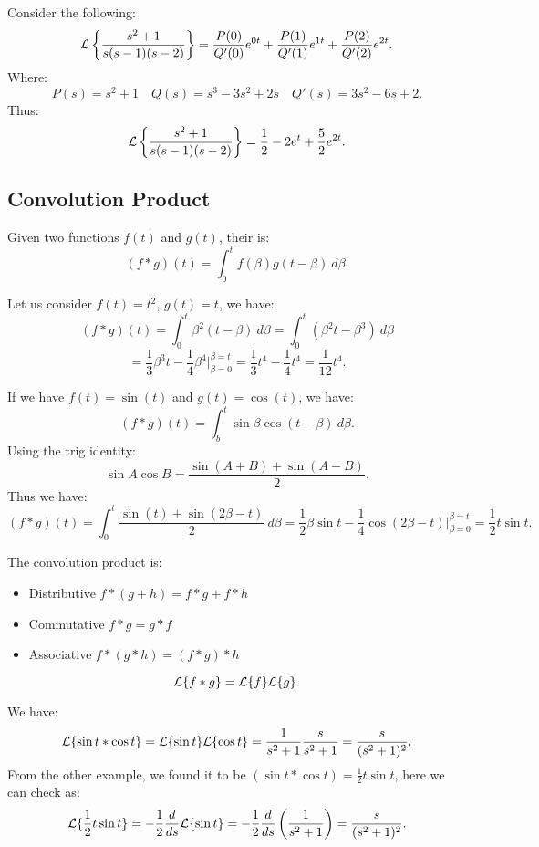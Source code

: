 \documentclass[../main/main.tex]{subfiles}
\begin{document}
\begin{example}
	Consider the following: \[
		\mathcal{L} \left\{ \frac{s^2+1}{s(s-1)(s-2)} \right\} = \frac{P(0)}{Q'(0)}e^{0t} + \frac{P(1)}{Q'(1)} e^{1t} + \frac{P(2)}{Q'(2)}e^{2t}
	.\] Where: \[
	P(s) = s^2+1 \quad Q(s) = s^{3}-3s^2+2s \quad Q'(s) = 3s^2-6s+2
	.\]  Thus: \[
		\mathcal{L} \left\{ \frac{s^2+1}{s(s-1)(s-2)} \right\} = \frac{1}{2} -2 e^{t} + \frac{5}{2}e^{2t} 
	.\] 
\end{example}
\subsection{Convolution Product}
\begin{definition}
	Given two functions $f(t)$ and $g(t)$, their  is: \[
		(f*g)(t) = \int^t_0 f(\beta) g(t-\beta)~d\beta
	.\] 
\end{definition}
\begin{example}
	Let us consider $f(t) = t^2$, $g(t) = t$, we have:  \[
		(f*g)(t) = \int^t_0 \beta^2(t-\beta)~d\beta = \int^t_0 \left( \beta^2t-\beta^{3} \right) ~d\beta
	\] \[
= \frac{1}{3}\beta^{3}t - \frac{1}{4}\beta^{4}\bigg\rvert^{\beta=t}_{\beta=0} = \frac{1}{3}t ^{4}- \frac{1}{4}t ^{4} = \frac{1}{12} t ^{4}
	.\] 
\end{example}
\begin{example}
	If we have $f(t) = \sin(t)$ and $g(t) = \cos(t)$, we have: \[
		(f*g)(t) = \int^t_b \sin \beta \cos(t-\beta)~d\beta 
	.\] Using the trig identity: \[
	\sin A \cos B = \frac{\sin(A+B)+\sin(A-B)}{2}
	.\] Thus we have: \[
(f*g)(t) = \int^t_0 \frac{\sin(t)+\sin(2\beta-t)}{2}~d\beta = \frac{1}{2}\beta\sin t - \frac{1}{4}\cos(2\beta-t)\bigg\rvert ^{\beta=t}_{\beta=0} = \frac{1}{2}t\sin t
	.\] 
\end{example}
\begin{theorem}
	The convolution product is: 
	\begin{itemize}
		\item Distributive $f*(g+h)=f*g+f*h$
		\item Commutative $f*g = g*f$
		\item Associative  $f*(g*h) = (f*g)* h$
	\end{itemize}
\end{theorem}
\begin{theorem}
	\[
	\mathcal{L} \{f*g\} = \mathcal{L} \{ f\} \mathcal{L} \{g\} 
	.\] 
\end{theorem}
\begin{example}
	We have: \[
		\mathcal{L} \{ \sin t * \cos t\} = \mathcal{L} \{\sin t\}\mathcal{L} \{\cos t\}  = \frac{1}{s^2+1}\frac{s}{s^2+1} = \frac{s}{(s^2+1)^2}
		.\] From the other example, we found it to be $(\sin t * \cos t) = \frac{1}{2}t\sin t$, here we can check as: \[
		\mathcal{L}  \{\frac{1}{2}t\sin t\}= -\frac{1}{2}\frac{d}{ds}\mathcal{L} \{ \sin t\}  = -\frac{1}{2}\frac{d}{ds}\left( \frac{1}{s^2+1} \right)   = \frac{s}{(s^2+1)^2}
	.\] 
\end{example}
\end{document}
